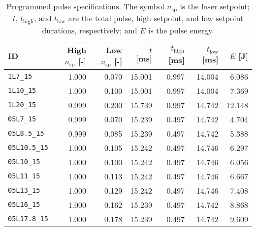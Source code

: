 \begin{table}[h]
\centering
\caption[Programmed pulse specifications]{Programmed pulse specifications. The symbol $n_\mathrm{sp}$ is the laser setpoint; $t$, $t_\mathrm{high}$, and $t_\mathrm{low}$ are the total pulse, high setpoint, and low setpoint durations, respectively; and $E$ is the pulse energy.}
\label{tab:app_pulseShapes}
\begin{tabular}{@{}lrrrrrr@{}}
\toprule
               ID & High $n_\mathrm{sp}$ [-] & Low $n_\mathrm{sp}$ [-] & $t$ [ms] & $t_\mathrm{high}$ [ms] & $t_\mathrm{low}$ [ms] & $E$ [J] \\
\midrule
    \verb|1L7_15| &                    1.000 &                   0.070 &   15.001 &                  0.997 &                14.004 &   6.086 \\
   \verb|1L10_15| &                    1.000 &                   0.100 &   15.001 &                  0.997 &                14.004 &   7.369 \\
   \verb|1L20_15| &                    0.999 &                   0.200 &   15.739 &                  0.997 &                14.742 &  12.148 \\
   \verb|05L7_15| &                    0.999 &                   0.070 &   15.239 &                  0.497 &                14.742 &   4.704 \\
 \verb|05L8.5_15| &                    0.999 &                   0.085 &   15.239 &                  0.497 &                14.742 &   5.388 \\
\verb|05L10.5_15| &                    1.000 &                   0.105 &   15.242 &                  0.497 &                14.746 &   6.297 \\
  \verb|05L10_15| &                    1.000 &                   0.100 &   15.242 &                  0.497 &                14.746 &   6.056 \\
  \verb|05L11_15| &                    1.000 &                   0.113 &   15.242 &                  0.497 &                14.746 &   6.667 \\
  \verb|05L13_15| &                    1.000 &                   0.129 &   15.242 &                  0.497 &                14.746 &   7.408 \\
  \verb|05L16_15| &                    1.000 &                   0.162 &   15.239 &                  0.497 &                14.742 &   8.868 \\
\verb|05L17.8_15| &                    1.000 &                   0.178 &   15.239 &                  0.497 &                14.742 &   9.609 \\

\end{tabular}
\end{table}
